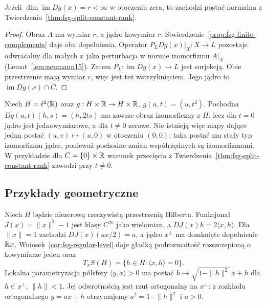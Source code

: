 \begin{wniosek}
\label{cor:fsg-finite-constant-rank}
Jeżeli $\dim\operatorname{im}Dg(x)=r<\infty$ w otoczeniu
zera, to zachodzi postać normalna z
Twierdzenia~\ref{thm:fsg-split-constant-rank}.
\end{wniosek}
\begin{proof}
Obraz $A$ ma wymiar $r$, a jądro kowymiar $r$.
Stwierdzenie~\ref{prop:fsg-finite-complements} daje oba
dopełnienia. Operator $P_LDg(x)|_X:X\to L$ pozostaje
odwracalny dla małych $x$ jako perturbacja w normie
izomorfizmu $A|_X$ (Lemat~\ref{lem:neumann15}).
Zatem $P_L:\operatorname{im}Dg(x)\to L$ jest surjekcją.
Obie przestrzenie mają wymiar $r$, więc jest też wstrzyknięciem.
Jego jądro to $\operatorname{im}Dg(x)\cap C$.
\end{proof}

\begin{przyklad}
\label{ex:fsg-infinite-rank}
Niech $H=\ell^2(\mathbb R)$ oraz $g:H\times\mathbb R\to H\times\mathbb R$,
$g(u,t)=(u,t^2)$. Pochodna $Dg(u,t)(h,s)=(h,2ts)$
ma zawsze obraz izomorficzny z $H$, lecz dla $t=0$ jądro
jest jednowymiarowe, a dla $t\ne0$ zerowe.
Nie istnieją więc mapy dające jedną postać $(u,v)\mapsto(u,0)$
w otoczeniu $(0,0)$: taka postać ma stały typ izomorfizmu
jąder, ponieważ pochodne zmian współrzędnych są izomorfizmami.
W przykładzie dla $C=\{0\}\times\mathbb R$ warunek przecięcia
z Twierdzenia~\ref{thm:fsg-split-constant-rank} zawodzi
przy $t\ne0$.
\end{przyklad}

\subsection{Przykłady geometryczne}

\begin{przyklad}
\label{ex:fsg-hilbert-sphere}
Niech $H$ będzie niezerową rzeczywistą przestrzenią Hilberta.
Funkcjonał $J(x)=\|x\|^2-1$ jest klasy $C^\infty$
jako wielomian, a $DJ(x)h=2\langle x,h\rangle$.
Dla $\|x\|=1$ zachodzi $DJ(x)(ax/2)=a$,
a jądro $x^\perp$ ma domknięte dopełnienie $\mathbb R x$.
Wniosek~\ref{cor:fsg-regular-level} daje gładką
podrozmaitość rozszczepioną o kowymiarze jeden oraz
\[
 T_xS(H)=\{h\in H:\langle x,h\rangle=0\}.
\]
Lokalna parametryzacja półsfery $\langle y,x\rangle>0$
ma postać $h\mapsto\sqrt{1-\|h\|^2}\,x+h$ dla
$h\in x^\perp$, $\|h\|<1$. Jej odwrotnością jest
rzut ortogonalny na $x^\perp$: z rozkładu ortogonalnego
$y=ax+h$ otrzymujemy $a^2=1-\|h\|^2$ i $a>0$.
\end{przyklad}

